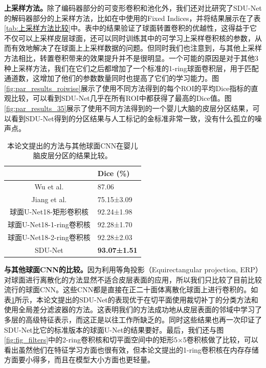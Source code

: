 \textbf{上采样方法。}除了编码器部分的可变形卷积和池化外，我们还对比研究了SDU-Net的解码器部分的上采样方法，比如在\cite{jiang2018spherical,parvathaneni2019cortical}中使用的Fixed Indices，并将结果展示在了表\ref{tab:上采样方法比较}中。表中的结果验证了球面转置卷积的优越性，这得益于它不仅可以上采样皮层球面，还可以同时训练其中的可学习上采样卷积核的参数，从而有效地解决了在球面上上采样数据的问题。但同时我们也注意到，与其他上采样方法相比，转置卷积带来的效果提升并不是很明显。一个可能的原因是对于其他3种上采样方法，我们在它们之后都增加了一个标准的1-ring球面卷积层，用于匹配通道数，这增加了他们的参数数量同时也提高了它们的学习能力。图\ref{fig:par_results_roiwise}展示了使用不同方法得到的每个ROI的平均Dice指标的直观比较，可以看到SDU-Net几乎在所有ROI中都获得了最高的Dice值。图\ref{fig:par_results_35}展示了使用不同方法得到的一个婴儿大脑的皮层分区结果，可以看到SDU-Net得到的分区结果与人工标记的金标准非常一致，没有什么孤立的噪声点。


\begin{table}[t]
		\caption{本论文提出的方法与其他球面CNN在婴儿脑皮层分区的结果比较。}
		\label{tab:与其他球面CNNs的比较}
		\centering
		\begin{tabularx}{0.8\linewidth}{c | X<{\centering}}
			\hline
			& Dice (\%)        \\
			\hline
			Wu et al. \cite{wu2018registration}										&   87.06\\
			Jiang et al. \cite{jiang2018spherical, parvathaneni2019cortical}		& 	75.15±3.09		\\
			球面U-Net18-矩形卷积核\cite{seong2018geometric,zhao2018distortion,tateno2018distortion}	& 	92.24±1.98\\
			球面U-Net18-1-ring卷积核 			&   92.28±1.70\\
			球面U-Net18-2-ring卷积核 				    &   92.28±2.03\\
			SDU-Net  											&	\textbf{93.07±1.51} \\
			\hline 
		\end{tabularx}
\end{table}

\textbf{与其他球面CNN的比较。}因为利用等角投影（Equirectangular projection, ERP）对球面进行离散化的方法\cite{s2018spherical,hu2017deep,esteves2018learning}显然不适合皮层表面的应用\cite{zhao2019spherical_ipmi,zhao2019spherical_isbi,lee2019spherephd}，所以我们只比较了目前比较流行的球面CNN\cite{wu2018registration,jiang2018spherical,seong2018geometric}。这些CNN都是直接在正二十面体离散化球面上进行卷积的。如表\ref{tab:与其他球面CNNs的比较}所示，本论文提出的SDU-Net的表现优于在切平面使用裁切补丁的分类方法\cite{wu2018registration}和使用全局差分滤波器的方法\cite{jiang2018spherical}。这表明我们的方法成功地从皮层表面的邻域中学习了多层的高级特征表示，而这正是以往工作\cite{wu2018registration,jiang2018spherical}所缺乏的。同时这些结果也再一次印证了SDU-Net比它的标准版本的球面U-Net\cite{zhao2019spherical_ipmi}的结果要好。最后，我们还与图\ref{fig:fig_filters}中的2-ring卷积核和切平面空间中的矩形5$\times$5卷积核做了比较，可以看出虽然他们在特征学习方面也很有效，但本论文提出的1-ring卷积核在内存存储方面要小得多，而且在模型大小方面也更轻量。

